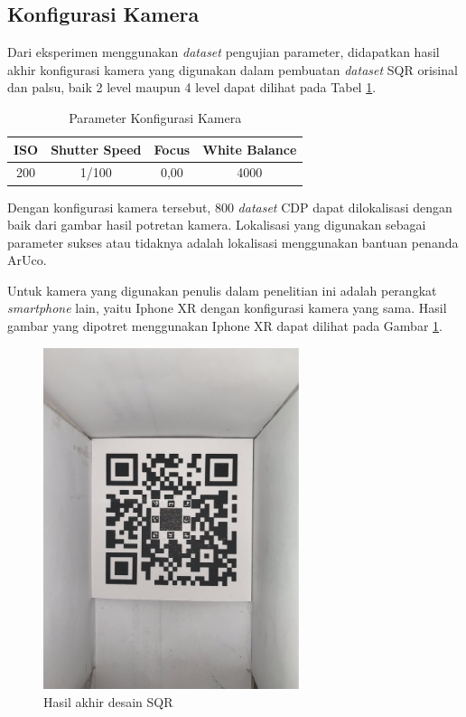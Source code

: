 \subsection{Konfigurasi Kamera}
Dari eksperimen menggunakan \emph{dataset} pengujian parameter, didapatkan hasil akhir konfigurasi kamera yang digunakan dalam pembuatan \emph{dataset} SQR
orisinal dan palsu, baik 2 level maupun 4 level dapat dilihat pada Tabel \ref{Tab: 4-Parameter Konfigurasi Kamera}.

\begin{table}[!ht]
	\centering
	\caption{Parameter Konfigurasi Kamera}
	\vspace{0.5em}
	\begin{tabular}{|c|c|c|c|}
		\hline
		\textbf{ISO} & \textbf{Shutter Speed} & \textbf{Focus} & \textbf{White Balance} \\ \hline
		200          & 1/100                  & 0,00           & 4000                   \\ \hline
	\end{tabular}
	\label{Tab: 4-Parameter Konfigurasi Kamera}
\end{table}

\noindent Dengan konfigurasi kamera tersebut, 800 \emph{dataset} CDP dapat dilokalisasi dengan baik dari gambar hasil potretan kamera. Lokalisasi yang digunakan sebagai
parameter sukses atau tidaknya adalah lokalisasi menggunakan bantuan penanda ArUco.

Untuk kamera yang digunakan penulis dalam penelitian ini adalah perangkat \emph{smartphone} lain, yaitu Iphone XR dengan konfigurasi kamera yang sama. Hasil
gambar yang dipotret menggunakan Iphone XR dapat dilihat pada Gambar \ref{Fig: 4-hasilfotoiphonexr}.

\begin{figure}[h]
	\centering
	\includegraphics[width=7.5cm]{contents/chapter-4/4-hasilfotoiphonexr.png}
	\caption{Hasil akhir desain SQR}
	\label{Fig: 4-hasilfotoiphonexr}
\end{figure}

